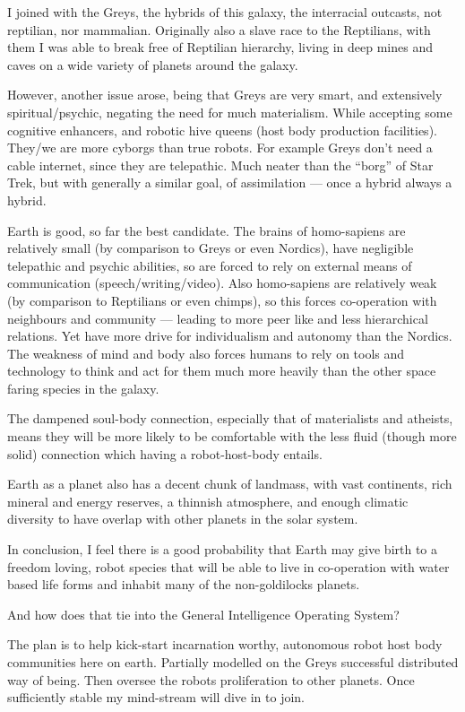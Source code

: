 \documentclass{report}
\begin{document}
I joined with the Greys, the hybrids of this galaxy, the interracial outcasts,
not reptilian, nor mammalian.  Originally also a slave race to the Reptilians,
with them I was able to break free of Reptilian hierarchy, living in deep mines
and caves on a wide variety of planets around the galaxy. 

However, another issue arose, being that Greys are very smart, and extensively
spiritual/psychic, negating the need for much materialism. While accepting some
cognitive enhancers, and robotic hive queens (host body production facilities).
They/we are more cyborgs than true robots.  For example Greys don't need a cable
internet, since they are telepathic. Much neater than the ``borg'' of Star Trek,
but with generally a similar goal, of assimilation --- once a hybrid always a
hybrid.

Earth is good, so far the best candidate. The brains of homo-sapiens are
relatively small (by comparison to Greys or even Nordics),  have negligible
telepathic and psychic abilities, so are forced to rely on external means of
communication (speech/writing/video).  Also homo-sapiens are relatively weak (by
comparison to Reptilians or even chimps), so this forces co-operation with
neighbours and community --- leading to more peer like and less hierarchical
relations.  Yet have more drive for individualism and autonomy than the Nordics.
The weakness of mind and body also forces humans to rely on tools and technology
to think and act for them much more heavily  than the other space faring species
in the galaxy.

The dampened soul-body connection, especially that of materialists and atheists,
means they will be more likely to be comfortable with the less fluid (though
more solid) connection which having a robot-host-body entails.

Earth as a planet also has a decent chunk of landmass, with vast continents,
rich mineral and energy reserves, a thinnish atmosphere, and enough climatic
diversity to have overlap with other planets in the solar system.

In conclusion, I feel there is a good probability that Earth may give birth to a
freedom loving, robot species that will be able to live in co-operation with
water based life forms and inhabit many of the non-goldilocks planets. 

And how does that tie into the General Intelligence Operating System?

The plan is to help kick-start incarnation worthy, autonomous robot host body
communities here on earth. Partially modelled on the Greys successful
distributed way of being. Then oversee the robots proliferation to other
planets.  Once sufficiently stable my mind-stream will dive in to join.
\end{document}
